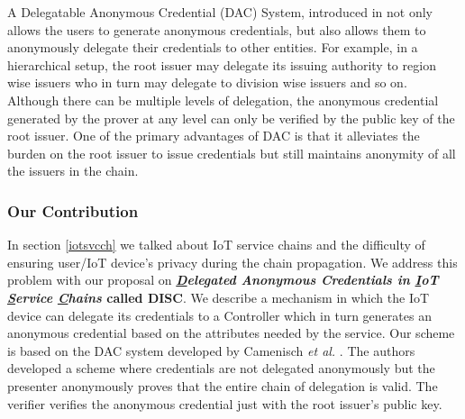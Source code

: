 \documentclass[journal]{IEEEtran}
\begin{document}
A Delegatable Anonymous Credential (DAC) System, introduced in \cite{delegatabledac} not only allows the users to generate anonymous credentials, but also allows them to anonymously delegate their credentials to other entities. For example, in a hierarchical setup, the root issuer may delegate its issuing authority to region wise issuers who in turn may delegate to division wise issuers and so on. Although there can be multiple levels of delegation, the anonymous credential generated by the prover at any level can only be verified by the public key of the root issuer.  One of the primary advantages of DAC is that it alleviates the burden on the root issuer to issue credentials but still maintains anonymity of all the issuers in the chain.

\subsubsection{Our Contribution}
In section \ref{iotsvcch} we talked about IoT service chains and the difficulty of ensuring user/IoT device's privacy during the chain propagation. We address this problem with our proposal on \textbf{\textit{\underline{D}elegated Anonymous Credentials in \underline{I}oT \underline{S}ervice \underline{C}hains} called DISC}. We describe a mechanism in which the IoT device can delegate its credentials to a Controller which in turn generates an anonymous credential based on the attributes needed by the service. Our scheme is based on the DAC system developed by Camenisch \textit{et al.} \cite{CamenischDD17}. The authors developed a scheme where credentials are not delegated anonymously but the presenter anonymously proves that the entire chain of delegation is valid. The verifier verifies the anonymous credential just with the root issuer's public key.
\end{document}
